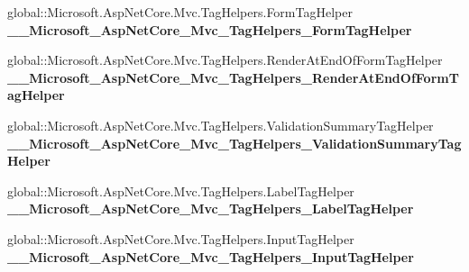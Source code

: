 \begin{DoxyCompactItemize}
global\+::\+Microsoft.\+Asp\+Net\+Core.\+Mvc.\+Tag\+Helpers.\+Form\+Tag\+Helper {\bfseries \+\_\+\+\_\+\+Microsoft\+\_\+\+Asp\+Net\+Core\+\_\+\+Mvc\+\_\+\+Tag\+Helpers\+\_\+\+Form\+Tag\+Helper}
\item 
\mbox{\label{class_projeto_e_s_w_1_1_areas_1_1_identity_1_1_pages_1_1_account_1_1_manage_1_1_areas___identity605f2cac3dc5a4ea38af9197eadd5652_a055ae056509034c85c25c65808b69717}} 
global\+::\+Microsoft.\+Asp\+Net\+Core.\+Mvc.\+Tag\+Helpers.\+Render\+At\+End\+Of\+Form\+Tag\+Helper {\bfseries \+\_\+\+\_\+\+Microsoft\+\_\+\+Asp\+Net\+Core\+\_\+\+Mvc\+\_\+\+Tag\+Helpers\+\_\+\+Render\+At\+End\+Of\+Form\+Tag\+Helper}
\item 
\mbox{\label{class_projeto_e_s_w_1_1_areas_1_1_identity_1_1_pages_1_1_account_1_1_manage_1_1_areas___identity605f2cac3dc5a4ea38af9197eadd5652_afd45a7d3ac4a69b0aed80ca8dcc71a58}} 
global\+::\+Microsoft.\+Asp\+Net\+Core.\+Mvc.\+Tag\+Helpers.\+Validation\+Summary\+Tag\+Helper {\bfseries \+\_\+\+\_\+\+Microsoft\+\_\+\+Asp\+Net\+Core\+\_\+\+Mvc\+\_\+\+Tag\+Helpers\+\_\+\+Validation\+Summary\+Tag\+Helper}
\item 
\mbox{\label{class_projeto_e_s_w_1_1_areas_1_1_identity_1_1_pages_1_1_account_1_1_manage_1_1_areas___identity605f2cac3dc5a4ea38af9197eadd5652_aba40671b6bb5e2e40023cf2aa9c10254}} 
global\+::\+Microsoft.\+Asp\+Net\+Core.\+Mvc.\+Tag\+Helpers.\+Label\+Tag\+Helper {\bfseries \+\_\+\+\_\+\+Microsoft\+\_\+\+Asp\+Net\+Core\+\_\+\+Mvc\+\_\+\+Tag\+Helpers\+\_\+\+Label\+Tag\+Helper}
\item 
\mbox{\label{class_projeto_e_s_w_1_1_areas_1_1_identity_1_1_pages_1_1_account_1_1_manage_1_1_areas___identity605f2cac3dc5a4ea38af9197eadd5652_a14250420d196cfb8a6a1d17d643fa8af}} 
global\+::\+Microsoft.\+Asp\+Net\+Core.\+Mvc.\+Tag\+Helpers.\+Input\+Tag\+Helper {\bfseries \+\_\+\+\_\+\+Microsoft\+\_\+\+Asp\+Net\+Core\+\_\+\+Mvc\+\_\+\+Tag\+Helpers\+\_\+\+Input\+Tag\+Helper}

\end{DoxyCompactItemize}
